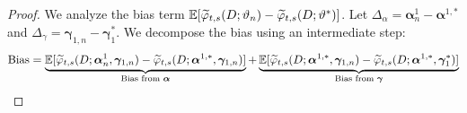 \documentclass{article}
\begin{document}
\begin{proof}
We analyze the bias term $\operatorname{\mathbb{E}}[\widetilde{\varphi}_{t,s}(D; \vartheta_n) - \widetilde{\varphi}_{t,s}(D; \vartheta^*)]$.
Let $\Delta_\alpha = \boldsymbol{\alpha}_n^1 - \boldsymbol{\alpha}^{1,*}$ and $\Delta_\gamma = \boldsymbol{\gamma}_{1,n} - \boldsymbol{\gamma}_1^*$.
We decompose the bias using an intermediate step:
\[
\text{Bias} = \underbrace{\operatorname{\mathbb{E}}[\widetilde{\varphi}_{t,s}(D; \boldsymbol{\alpha}_n^1, \boldsymbol{\gamma}_{1,n}) - \widetilde{\varphi}_{t,s}(D; \boldsymbol{\alpha}^{1,*}, \boldsymbol{\gamma}_{1,n})]}_{\text{Bias from } \boldsymbol{\alpha}}
+ \underbrace{\operatorname{\mathbb{E}}[\widetilde{\varphi}_{t,s}(D; \boldsymbol{\alpha}^{1,*}, \boldsymbol{\gamma}_{1,n}) - \widetilde{\varphi}_{t,s}(D; \boldsymbol{\alpha}^{1,*}, \boldsymbol{\gamma}_1^*)]}_{\text{Bias from } \boldsymbol{\gamma}}
\]


\end{proof}
\end{document}
